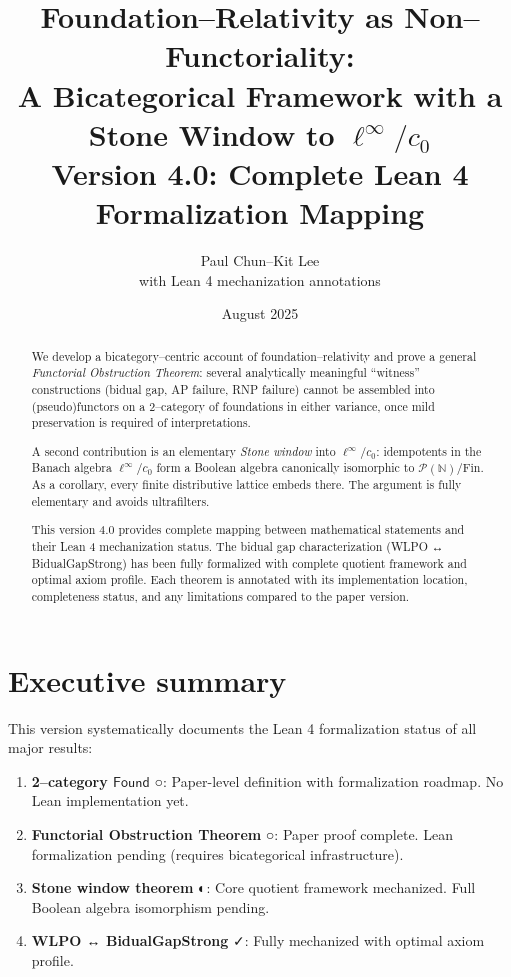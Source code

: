\documentclass[11pt]{article}
\title{Foundation--Relativity as Non--Functoriality:\\
A Bicategorical Framework with a Stone Window to \(\ell^\infty/c_0\)\\
\large{Version 4.0: Complete Lean 4 Formalization Mapping}}
\author{Paul Chun--Kit Lee\\
\small{with Lean 4 mechanization annotations}}
\date{August 2025}
\theoremstyle{definition}
\theoremstyle{remark}
\newcommand{\leanok}{\textcolor{green!70!black}{✓}}
\newcommand{\leanpartial}{\textcolor{orange!70!black}{◐}}
\newcommand{\leanpending}{\textcolor{red!70!black}{○}}
\newcommand{\Found}{\mathsf{Found}}
\begin{document}
\maketitle

\begin{abstract}
We develop a bicategory--centric account of foundation--relativity and prove a general \emph{Functorial Obstruction Theorem}: several analytically meaningful ``witness'' constructions (bidual gap, AP failure, RNP failure) cannot be assembled into (pseudo)functors on a 2--category of foundations in either variance, once mild preservation is required of interpretations. 

A second contribution is an elementary \emph{Stone window} into \(\ell^\infty/c_0\): idempotents in the Banach algebra \(\ell^\infty/c_0\) form a Boolean algebra canonically isomorphic to \(\mathcal{P}(\mathbb N)/\mathrm{Fin}\). As a corollary, every finite distributive lattice embeds there. The argument is fully elementary and avoids ultrafilters.

This version 4.0 provides complete mapping between mathematical statements and their Lean 4 mechanization status. The bidual gap characterization (WLPO ↔ BidualGapStrong) has been fully formalized with complete quotient framework and optimal axiom profile. Each theorem is annotated with its implementation location, completeness status, and any limitations compared to the paper version.
\end{abstract}

\tableofcontents

\section{Executive summary}\label{sec:summary}

This version systematically documents the Lean 4 formalization status of all major results:

\begin{enumerate}
\item \textbf{2--category \(\Found\)} \leanpending: Paper-level definition with formalization roadmap. No Lean implementation yet.

\item \textbf{Functorial Obstruction Theorem} \leanpending: Paper proof complete. Lean formalization pending (requires bicategorical infrastructure).

\item \textbf{Stone window theorem} \leanpartial: Core quotient framework mechanized. Full Boolean algebra isomorphism pending.

\item \textbf{WLPO ↔ BidualGapStrong} \leanok: Fully mechanized with optimal axiom profile.
\end{enumerate}
\end{document}
